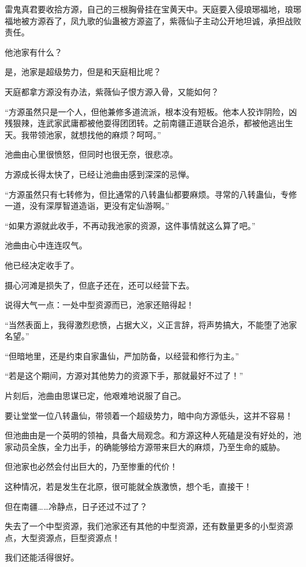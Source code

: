 \begin{this_body}
雷鬼真君要收拾方源，自己的三根胸骨挂在宝黄天中。天庭要入侵琅琊福地，琅琊福地被方源吞了，凤九歌的仙蛊被方源盗了，紫薇仙子主动公开地坦诚，承担战败责任。

他池家有什么？

是，池家是超级势力，但是和天庭相比呢？

天庭都拿方源没有办法，紫薇仙子恨方源入骨，又能如何？

“方源虽然只是一个人，但他兼修多道流派，根本没有短板。他本人狡诈阴险，凶残狠辣，连武家武庸都被他耍得团团转。之前南疆正道联合追杀，都被他逃出生天。我带领池家，就想找他的麻烦？呵呵。”

池曲由心里很愤怒，但同时也很无奈，很悲凉。

方源成长得太快了，已经让池曲由感到深深的忌惮。

“方源虽然只有七转修为，但比通常的八转蛊仙都要麻烦。寻常的八转蛊仙，专修一道，没有深厚智道造诣，更没有定仙游啊。”

“如果方源就此收手，不再动我池家的资源，这件事情就这么算了吧。”

池曲由心中连连叹气。

他已经决定收手了。

摄心河滩是损失了，但底子还在，还可以经营下去。

说得大气一点：一处中型资源而已，池家还赔得起！

“当然表面上，我得激烈悲愤，占据大义，义正言辞，将声势搞大，不能堕了池家名望。”

“但暗地里，还是约束自家蛊仙，严加防备，以经营和修行为主。”

“若是这个期间，方源对其他势力的资源下手，那就最好不过了！”

片刻后，池曲由思谋已定，他艰难地说服了自己。

要让堂堂一位八转蛊仙，带领着一个超级势力，暗中向方源低头，这并不容易！

但池曲由是一个英明的领袖，具备大局观念。和方源这种人死磕是没有好处的，池家动员全族，全力出手，的确能够给方源带来巨大的麻烦，乃至生命的威胁。

但池家也必然会付出巨大的，乃至惨重的代价！

这种情况，若是发生在北原，很可能就全族激愤，想个毛，直接干！

但在南疆……冷静点，日子还过不过了？

失去了一个中型资源，我们池家还有其他的中型资源，还有数量更多的小型资源点，大型资源点，巨型资源点！

我们还能活得很好。


\end{this_body}
